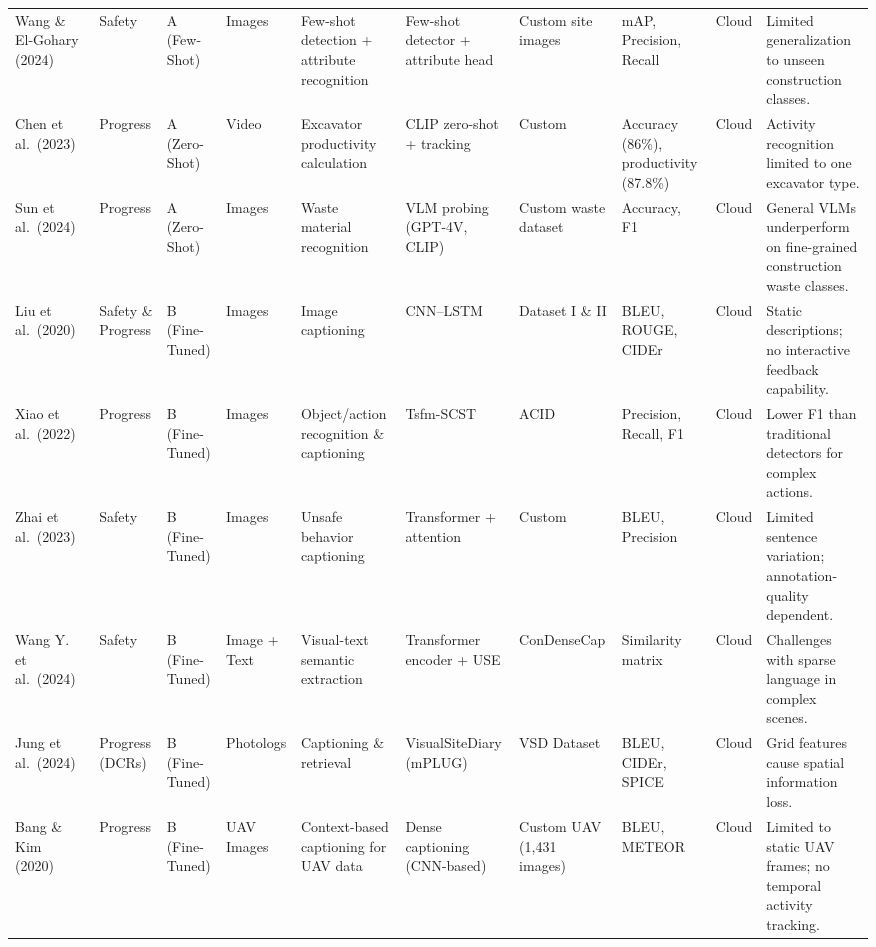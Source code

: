 \documentclass[10pt,letterpaper]{article}
\begin{document}
\begin{landscape}
\begin{longtable}{L{2.8cm} L{1.7cm} L{2.0cm} L{2.5cm} L{1.5cm} L{3.0cm} L{1.8cm} L{2.0cm} L{2.0cm} L{3.2cm}}
Wang \& El-Gohary (2024) & Safety & A (Few-Shot) & Images & Few-shot detection + attribute recognition & Few-shot detector + attribute head & Custom site images & mAP, Precision, Recall & Cloud & Limited generalization to unseen construction classes.\\

Chen et al.\ (2023)~\cite{chenc2023} & Progress & A (Zero-Shot) & Video & Excavator productivity calculation & CLIP zero-shot + tracking & Custom & Accuracy (86\%), productivity (87.8\%) & Cloud & Activity recognition limited to one excavator type.\\

Sun et al.\ (2024)~\cite{sun2024} & Progress & A (Zero-Shot) & Images & Waste material recognition & VLM probing (GPT-4V, CLIP) & Custom waste dataset & Accuracy, F1 & Cloud & General VLMs underperform on fine-grained construction waste classes.\\

Liu et al.\ (2020) & Safety \& Progress & B (Fine-Tuned) & Images & Image captioning & CNN--LSTM & Dataset I \& II & BLEU, ROUGE, CIDEr & Cloud & Static descriptions; no interactive feedback capability.\\

Xiao et al.\ (2022) & Progress & B (Fine-Tuned) & Images & Object/action recognition \& captioning & Tsfm-SCST & ACID & Precision, Recall, F1 & Cloud & Lower F1 than traditional detectors for complex actions.\\

Zhai et al.\ (2023)~\cite{zhai2023} & Safety & B (Fine-Tuned) & Images & Unsafe behavior captioning & Transformer + attention & Custom & BLEU, Precision & Cloud & Limited sentence variation; annotation-quality dependent.\\

Wang Y. et al.\ (2024) & Safety & B (Fine-Tuned) & Image + Text & Visual-text semantic extraction & Transformer encoder + USE & ConDenseCap & Similarity matrix & Cloud & Challenges with sparse language in complex scenes.\\

Jung et al.\ (2024) & Progress (DCRs) & B (Fine-Tuned) & Photologs & Captioning \& retrieval & VisualSiteDiary (mPLUG) & VSD Dataset & BLEU, CIDEr, SPICE & Cloud & Grid features cause spatial information loss.\\

Bang \& Kim (2020)~\cite{bang2020} & Progress & B (Fine-Tuned) & UAV Images & Context-based captioning for UAV data & Dense captioning (CNN-based) & Custom UAV (1,431 images) & BLEU, METEOR & Cloud & Limited to static UAV frames; no temporal activity tracking.\\


\end{longtable}
\end{landscape}
\end{document}
